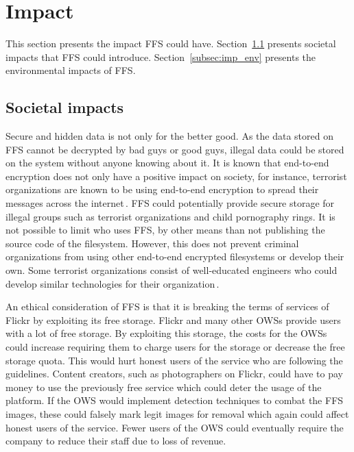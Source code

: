 \section{Impact}
\label{sec:imp}
This section presents the impact \gls{FFS} could have. Section~\ref{subsec:imp_soc} presents societal impacts that \gls{FFS} could introduce. Section~\ref{subsec:imp_env} presents the environmental impacts of \gls{FFS}.

\subsection{Societal impacts}
\label{subsec:imp_soc}
Secure and hidden data is not only for the better good. As the data stored on \gls{FFS} cannot be decrypted by bad guys or good guys, illegal data could be stored on the system without anyone knowing about it. It is known that \mbox{end-to-end} encryption does not only have a positive impact on society, for instance, terrorist organizations are known to be using \mbox{end-to-end} encryption to spread their messages across the internet\,\cite{ruddEncryptionCounterterrorismGetting2017}. \gls{FFS} could potentially provide secure storage for illegal groups such as terrorist organizations and child pornography rings. It is not possible to limit who uses \gls{FFS}, by other means than not publishing the source code of the filesystem. However, this does not prevent criminal organizations from using other \mbox{end-to-end} encrypted filesystems or develop their own. Some terrorist organizations consist of \mbox{well-educated} engineers who could develop similar technologies for their organization\,\cite{berrebyEngineeringTerror2010}.

An ethical consideration of \gls{FFS} is that it is breaking the terms of services of Flickr by exploiting its free storage. Flickr and many other \gls{OWS}s provide users with a lot of free storage. By exploiting this storage, the costs for the \gls{OWS}s could increase requiring them to charge users for the storage or decrease the free storage quota. This would hurt honest users of the service who are following the guidelines. Content creators, such as photographers on Flickr, could have to pay money to use the previously free service which could deter the usage of the platform. If the \gls{OWS} would implement detection techniques to combat the \gls{FFS} images, these could falsely mark legit images for removal which again could affect honest users of the service. Fewer users of the \gls{OWS} could eventually require the company to reduce their staff due to loss of revenue. 

